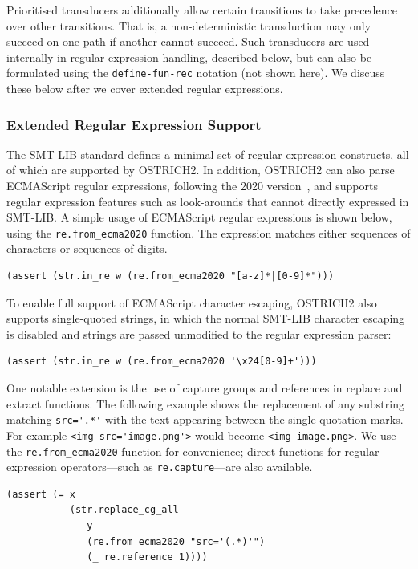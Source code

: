 Prioritised transducers additionally allow certain transitions to take
precedence over other transitions.
That is, a non-deterministic transduction may only succeed on one path if another cannot succeed.
Such transducers are used internally in regular expression handling,
described below, but can also be formulated using the
\verb!define-fun-rec! notation (not shown here). We discuss these below after we
cover extended regular expressions.

\subsubsection{Extended Regular Expression Support}

The SMT-LIB standard defines a minimal set of regular expression
constructs,
all of which are supported by OSTRICH2.
In addition, OSTRICH2 can also parse ECMAScript regular expressions,
following the 2020 version~\cite{ECMAScript11}, and supports regular
expression features such as look-arounds that cannot directly
expressed in SMT-LIB.
A simple usage of ECMAScript regular expressions is shown below, using the \verb+re.from_ecma2020+ function.
The expression matches either sequences of characters or sequences of digits.
\begin{lstlisting}[language=SMTLib,frame=single]
(assert (str.in_re w (re.from_ecma2020 "[a-z]*|[0-9]*")))
\end{lstlisting}
To enable full support of ECMAScript character escaping, OSTRICH2 also supports
single-quoted strings, in which the normal SMT-LIB character escaping
is disabled and strings are passed unmodified to the
regular expression parser:
\begin{lstlisting}[language=SMTLib,frame=single]
(assert (str.in_re w (re.from_ecma2020 '\x24[0-9]+')))
\end{lstlisting}

One notable extension is the use of capture groups and references in replace and extract functions.
The following example shows the replacement of any substring matching \verb+src='.*'+ with the text appearing between the single quotation marks.
For example
%
\verb+<img src='image.png'>+ would become
%
\verb+<img image.png>+.
%
We use the \verb+re.from_ecma2020+ function for convenience;
direct functions for regular expression operators---such as \verb+re.capture+---are also available.
\begin{lstlisting}[language=SMTLib,frame=single]
(assert (= x
           (str.replace_cg_all
              y
              (re.from_ecma2020 "src='(.*)'")
              (_ re.reference 1))))
\end{lstlisting}

